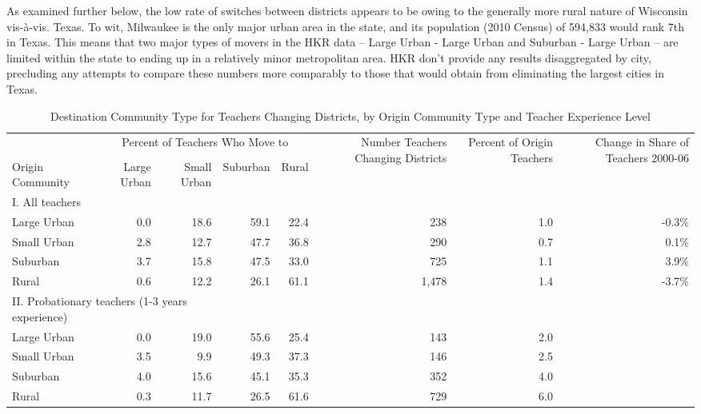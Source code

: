 \documentclass[]{article}
\begin{document}
As examined further below, the low rate of switches between districts
appears to be owing to the generally more rural nature of Wisconsin
vis-à-vis. Texas. To wit, Milwaukee is the only major urban area in the
state, and its population (2010 Census) of 594,833 would rank 7th in
Texas. This means that two major types of movers in the HKR data --
Large Urban - Large Urban and Suburban - Large Urban -- are limited
within the state to ending up in a relatively minor metropolitan area.
HKR don't provide any results disaggregated by city, precluding any
attempts to compare these numbers more comparably to those that would
obtain from eliminating the largest cities in Texas.

\begin{sidewaystable}[htbp]
\centering
\begin{tabular}{lrrrrrrr}
  \hline
 & \multicolumn{4}{c}{\multirow{2}{*}{Percent of Teachers Who Move to}} & \multirow{4}{*}{\parbox{0.09\linewidth}{Number Teachers Changing Districts}} & \multirow{4}{*}{\parbox{0.07\linewidth}{Percent of Origin Teachers}} & \multirow{4}{*}{\parbox{0.07\linewidth}{Change in Share of Teachers 2000-06}}\\
 & \multicolumn{4}{c}{} & & & \\ \cline{2-5}
& & & & & & & \\
Origin Community & Large Urban & Small Urban & Suburban & Rural &  &  &  \\ 
  \hline
I. All teachers & & & & & & & \\
\quad Large Urban & 0.0 & 18.6 & 59.1 & 22.4 & 238 & 1.0 & -0.3\% \\ 
  \quad Small Urban & 2.8 & 12.7 & 47.7 & 36.8 & 290 & 0.7 & 0.1\% \\ 
  \quad Suburban & 3.7 & 15.8 & 47.5 & 33.0 & 725 & 1.1 & 3.9\% \\ 
  \quad Rural & 0.6 & 12.2 & 26.1 & 61.1 & 1,478 & 1.4 & -3.7\% \\ 
\multicolumn{3}{l}{II. Probationary teachers (1-3 years experience)} & & & & & \\
  \quad Large Urban & 0.0 & 19.0 & 55.6 & 25.4 & 143 & 2.0 &  \\ 
  \quad Small Urban & 3.5 & 9.9 & 49.3 & 37.3 & 146 & 2.5 &  \\ 
  \quad Suburban & 4.0 & 15.6 & 45.1 & 35.3 & 352 & 4.0 &  \\ 
  \quad Rural & 0.3 & 11.7 & 26.5 & 61.6 & 729 & 6.0 &  \\ 
   \hline
\end{tabular}
\caption{Destination Community Type for Teachers Changing Districts, by Origin Community Type and Teacher Experience Level} 
\label{tbl:markov}
\end{sidewaystable}
\end{document}

